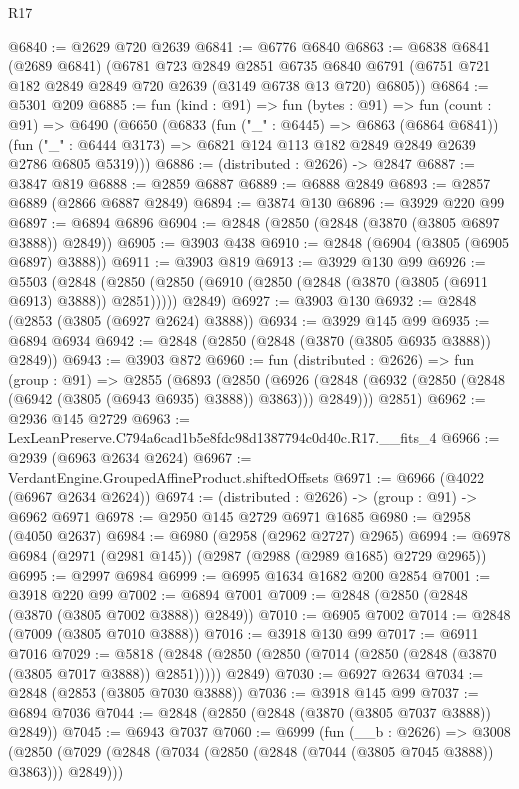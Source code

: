\begin{lexlean}{R17}
\begin{coremodule}
@6840 := @2629 @720 @2639
@6841 := @6776 @6840
@6863 := @6838
    @6841
    (@2689 @6841)
    (@6781
      @723
      @2849
      @2851
      @6735
      @6840
      @6791
      (@6751 @721 @182 @2849 @2849 @720 @2639 (@3149 @6738 @13 @720) @6805))
@6864 := @5301 @209
@6885 := fun (kind : @91) =>
  fun (bytes : @91) =>
  fun (count : @91) =>
  @6490
    (@6650
      (@6833
        (fun ("_" : @6445) => @6863 (@6864 @6841))
        (fun ("_" : @6444 @3173) => @6821 @124 @113 @182 @2849 @2849 @2639 @2786 @6805 @5319)))
@6886 := (distributed : @2626) -> @2847
@6887 := @3847 @819
@6888 := @2859 @6887
@6889 := @6888 @2849
@6893 := @2857 @6889 (@2866 @6887 @2849)
@6894 := @3874 @130
@6896 := @3929 @220 @99
@6897 := @6894 @6896
@6904 := @2848 (@2850 (@2848 (@3870 (@3805 @6897 @3888)) @2849))
@6905 := @3903 @438
@6910 := @2848 (@6904 (@3805 (@6905 @6897) @3888))
@6911 := @3903 @819
@6913 := @3929 @130 @99
@6926 := @5503
    (@2848 (@2850 (@2850 (@6910 (@2850 (@2848 (@3870 (@3805 (@6911 @6913) @3888)) @2851))))) @2849)
@6927 := @3903 @130
@6932 := @2848 (@2853 (@3805 (@6927 @2624) @3888))
@6934 := @3929 @145 @99
@6935 := @6894 @6934
@6942 := @2848 (@2850 (@2848 (@3870 (@3805 @6935 @3888)) @2849))
@6943 := @3903 @872
@6960 := fun (distributed : @2626) =>
  fun (group : @91) =>
  @2855
    (@6893
      (@2850
        (@6926 (@2848 (@6932 (@2850 (@2848 (@6942 (@3805 (@6943 @6935) @3888)) @3863))) @2849)))
      @2851)
@6962 := @2936 @145 @2729
@6963 := LexLeanPreserve.C794a6cad1b5e8fdc98d1387794c0d40c.R17.__fits_4
@6966 := @2939 (@6963 @2634 @2624)
@6967 := VerdantEngine.GroupedAffineProduct.shiftedOffsets
@6971 := @6966 (@4022 (@6967 @2634 @2624))
@6974 := (distributed : @2626) -> (group : @91) -> @6962 @6971
@6978 := @2950 @145 @2729 @6971 @1685
@6980 := @2958 (@4050 @2637)
@6984 := @6980 (@2958 (@2962 @2727) @2965)
@6994 := @6978 @6984 (@2971 (@2981 @145)) (@2987 (@2988 (@2989 @1685) @2729 @2965))
@6995 := @2997 @6984
@6999 := @6995 @1634 @1682 @200 @2854
@7001 := @3918 @220 @99
@7002 := @6894 @7001
@7009 := @2848 (@2850 (@2848 (@3870 (@3805 @7002 @3888)) @2849))
@7010 := @6905 @7002
@7014 := @2848 (@7009 (@3805 @7010 @3888))
@7016 := @3918 @130 @99
@7017 := @6911 @7016
@7029 := @5818
    (@2848 (@2850 (@2850 (@7014 (@2850 (@2848 (@3870 (@3805 @7017 @3888)) @2851))))) @2849)
@7030 := @6927 @2634
@7034 := @2848 (@2853 (@3805 @7030 @3888))
@7036 := @3918 @145 @99
@7037 := @6894 @7036
@7044 := @2848 (@2850 (@2848 (@3870 (@3805 @7037 @3888)) @2849))
@7045 := @6943 @7037
@7060 := @6999
    (fun (__b : @2626) =>
    @3008
      (@2850 (@7029 (@2848 (@7034 (@2850 (@2848 (@7044 (@3805 @7045 @3888)) @3863))) @2849)))

\end{coremodule}
\end{lexlean}
